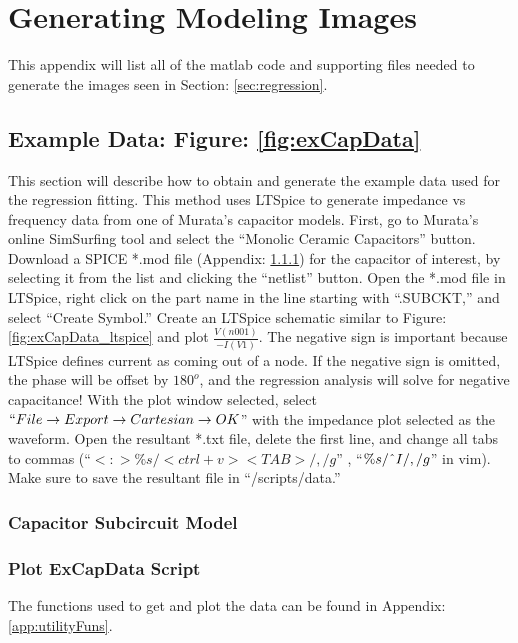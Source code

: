 \section{Generating Modeling Images}
\label{app:genModelingImages}
This appendix will list all of the matlab code and supporting files needed to generate the images seen in Section: \ref{sec:regression}.

\subsection{Example Data: Figure: \ref{fig:exCapData}}


This section will describe how to obtain and generate the example data used for the regression fitting. This method uses LTSpice to generate impedance vs frequency data from one of Murata's capacitor models. First, go to Murata's online SimSurfing tool \cite{simSurfing} and select the ``Monolic Ceramic Capacitors'' button. Download a SPICE *.mod file (Appendix: \ref{app:subcir}) for the capacitor of interest, by selecting it from the list and clicking the ``netlist'' button. Open the *.mod file in LTSpice, right click on the part name in the line starting with ``.SUBCKT,'' and select ``Create Symbol.'' Create an LTSpice schematic similar to Figure: \ref{fig:exCapData_ltspice} and plot $\frac{V(n001)}{-I(V1)}$. The negative sign is important because LTSpice defines current as coming out of a node. If the negative sign is omitted, the phase will be offset by $180^o$, and the regression analysis will solve for negative capacitance! With the plot window selected, select  $``File\rightarrow Export\rightarrow Cartesian\rightarrow OK$'' with the impedance plot selected as the waveform. Open the resultant *.txt file, delete the first line, and change all tabs to commas (``$<:>\%s/<ctrl+v><TAB>/,/g$'' , ``$\%s/\string^I/,/g$'' in vim). Make sure to save the resultant file in ``/scripts/data.''

\subsubsection{Capacitor Subcircuit Model}
\label{app:subcir}


\subsubsection{Plot ExCapData Script}
The functions used to get and plot the data can be found in Appendix: \ref{app:utilityFuns}.


